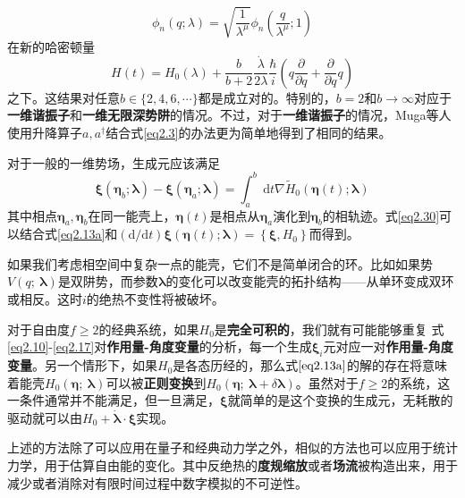 \begin{equation}
    \phi_{n}(q ; \lambda)=\sqrt{\frac{1}{\lambda^{\mu}}} \phi_{n}\left(\frac{q}{\lambda^{\mu}} ; 1\right)
    \label{eq2.29}
\end{equation}
在新的哈密顿量
\begin{equation}
    H(t)=H_{0}(\lambda)+\frac{b}{b+2} \frac{\dot{\lambda}}{2 \lambda} \frac{\hbar}{i}\left(q \frac{\partial}{\partial q}+\frac{\partial}{\partial q} q\right)
    \label{eq2.29.5}
\end{equation}
之下。这结果对任意$b \in \{ 2, 4, 6, \cdots\}$都是成立对的。特别的，$b=2$和$b \to \infty$对应于\textbf{一维谐振子}和\textbf{一维无限深势阱}的情况。不过，对于\textbf{一维谐振子}的情况，Muga等人使用升降算子$a, a^{\dagger}$结合式\eqref{eq2.3}的办法更为简单地得到了相同的结果。\cite{Muga2010}

对于一般的一维势场，生成元应该满足
\begin{equation}
    \boldsymbol{\xi}\left(\bm{\eta}_{b} ; \boldsymbol{\lambda}\right)-\boldsymbol{\xi}\left(\bm{\eta}_{a} ; \boldsymbol{\lambda}\right)=\int_{a}^{b} \mathrm{~d} t \nabla \tilde{H}_{0}(\bm{\eta}(t) ; \boldsymbol{\lambda})
    \label{eq2.30}
\end{equation}
其中相点$\bm{\eta}_{a}, \bm{\eta}_{b}$在同一能壳上，$\bm{\eta}(t)$是相点从$\bm{\eta}_{a}$演化到$\bm{\eta}_{b}$的相轨迹。式\eqref{eq2.30}可以结合式\eqref{eq2.13a}和$(\mathrm{d} / \mathrm{d} t) \boldsymbol{\xi}(\bm{\eta}(t) ; \boldsymbol{\lambda})=\left\{\boldsymbol{\xi}, H_{0}\right\}$而得到。

如果我们考虑相空间中复杂一点的能壳，它们不是简单闭合的环。比如如果势$V(q;\ \bm{\lambda})$是双阱势，而参数$\bm{\lambda}$的变化可以改变能壳的拓扑结构——从单环变成双环或相反。这时$i$的绝热不变性将被破坏。\cite{Tennyson1986,Cary1986,Hannay1986}

对于自由度$f \geq 2$的经典系统，如果$H_0$是\textbf{完全可积的}\cite{LiuChuan2019}，我们就有可能能够重复
式\eqref{eq2.10}-\eqref{eq2.17}对\textbf{作用量-角度变量}的分析，每一个生成$\bm{\xi}_i$元对应一对\textbf{作用量-角度变量}。另一个情形下，如果$H_0$是各态历经的，那么式$\eqref{eq2.13a}$的解的存在将意味着能壳$H_0 (\bm{\eta};\ \bm{\lambda})$可以被\textbf{正则变换}到$H_0 (\bm{\eta};\ \bm{\lambda}+\delta \bm{\lambda} )$。\cite{Jarzynski1995}虽然对于$f \geq 2$的系统，这一条件通常并不能满足，但一旦满足，$\bm{\xi}$就简单的是这个变换的生成元，无耗散的驱动就可以由$H_0 + \dot{\boldsymbol{\lambda}} \cdot \boldsymbol{\xi}$实现。

上述的方法除了可以应用在量子和经典动力学之外，相似的方法也可以应用于统计力学，用于估算自由能的变化。其中反绝热的\textbf{度规缩放}\cite{Miller2000}或者\textbf{场流}\cite{Vaikuntanathan2008}被构造出来，用于减少或者消除对有限时间过程中数字模拟的不可逆性。

